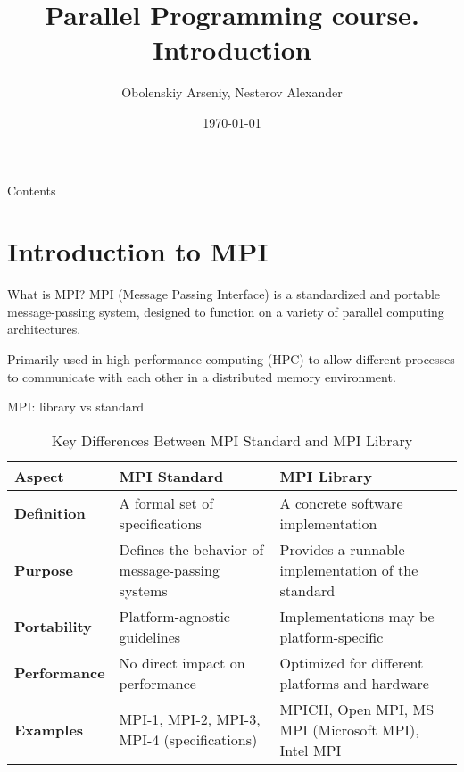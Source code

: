 \documentclass{beamer}
\title[Parallel Programming. Introduction]{Parallel Programming course. Introduction}
\author{Obolenskiy Arseniy, Nesterov Alexander}
\institute{Nizhny Novgorod State University}
\date{\today} %
\begin{document}
\begin{frame}
    \titlepage
\end{frame}

\begin{frame}{Contents}
    \tableofcontents
\end{frame}

\section{Introduction to MPI}

\begin{frame}[fragile]{What is MPI?}
  MPI (Message Passing Interface) is a standardized and portable message-passing system, designed to function on a variety of parallel computing architectures.

  Primarily used in high-performance computing (HPC) to allow different processes to communicate with each other in a distributed memory environment.
\end{frame}

\begin{frame}[fragile]{MPI: library vs standard}
  \begin{table}[h!]
    \begin{tabular}{| p{2.1cm} | p{4.2 cm} | p{4.2 cm} |}
      \hline
      \textbf{Aspect} & \textbf{MPI Standard} & \textbf{MPI Library} \\
      \hline
      \textbf{Definition} & A formal set of specifications & A concrete software implementation \\
      \hline
      \textbf{Purpose} & Defines the behavior of message-passing systems & Provides a runnable implementation of the standard \\
      \hline
      \textbf{Portability} & Platform-agnostic guidelines & Implementations may be platform-specific \\
      \hline
      \textbf{Performance} & No direct impact on performance & Optimized for different platforms and hardware \\
      \hline
      \textbf{Examples} & MPI-1, MPI-2, MPI-3, MPI-4 (specifications) & MPICH, Open MPI, MS MPI (Microsoft MPI), Intel MPI \\
      \hline
    \end{tabular}
    \caption{Key Differences Between MPI Standard and MPI Library}
  \end{table}
\end{frame}
\end{document}
